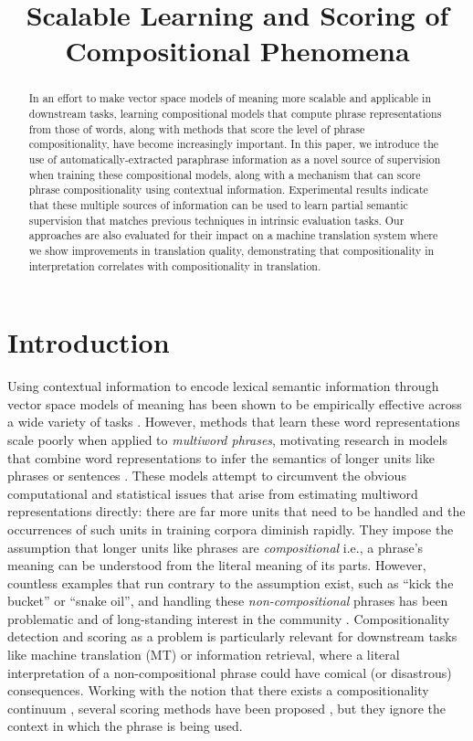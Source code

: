 \documentclass[11pt,letterpaper]{article}
\title{Scalable Learning and Scoring of Compositional Phenomena}
\date{}
\begin{document}
\maketitle
\begin{abstract}
	In an effort to make vector space models of meaning more scalable and applicable in downstream tasks, learning compositional models that compute phrase representations from those of words, along with methods that score the level of phrase compositionality, have become increasingly important. 
	In this paper, we introduce the use of automatically-extracted paraphrase information as a novel source of supervision when training these compositional models, along with a mechanism that can score phrase compositionality using contextual information. 
	Experimental results indicate that these multiple sources of information can be used to learn partial semantic supervision that matches previous techniques in intrinsic evaluation tasks. 
	Our approaches are also evaluated for their impact on a machine translation system where we show improvements in translation quality, demonstrating that compositionality in interpretation correlates with compositionality in translation. 
 \end{abstract}

\section{Introduction}

Using contextual information to encode lexical semantic information through vector space models of meaning has been shown to be empirically effective across a wide variety of tasks \cite{Turian2010,Turney2010,Mikolov2013b}.  
However, methods that learn these word representations \cite[\emph{inter alia}]{Sahlgren2006,Collobert2011} scale poorly when applied to \emph{multiword phrases}, motivating research in models that combine word representations to infer the semantics of longer units like phrases or sentences \cite{Mitchell2010,Baroni2010,Socher2013}.
These models attempt to circumvent the obvious computational and statistical issues that arise from estimating multiword representations directly: there are far more units that need to be handled and the occurrences of such units in training corpora diminish rapidly.  
They impose the assumption that longer units like phrases are \emph{compositional} i.e., a phrase's meaning can be understood from the literal meaning of its parts. 
However, countless examples that run contrary to the assumption exist, such as ``kick the bucket'' or ``snake oil'', and handling these \emph{non-compositional} phrases has been problematic and of long-standing interest in the community \cite{Lin1999,Sag2002}.
Compositionality detection and scoring as a problem is particularly relevant for downstream tasks like machine translation (MT) or information retrieval, where a literal interpretation of a non-compositional phrase could have comical (or disastrous) consequences. 
Working with the notion that there exists a compositionality continuum \cite{McCarthy2003}, several scoring methods have been proposed \cite{Reddy2011,Kiela2013,Salehi2014}, but they ignore the context in which the phrase is being used. 
\end{document}
